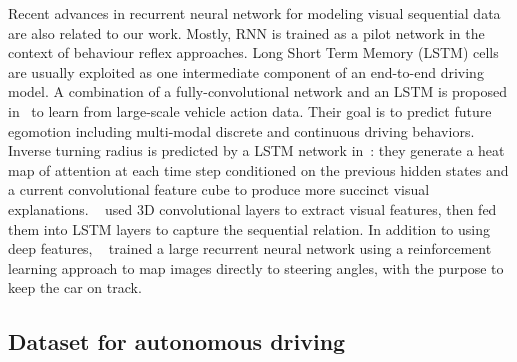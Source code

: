 \documentclass[10pt,twocolumn,letterpaper]{article}
\begin{document}
Recent advances in recurrent neural network for modeling visual sequential data are also related to our work.
Mostly, RNN is trained as a pilot network in the context of behaviour reflex approaches.
Long Short Term Memory (LSTM) cells are usually exploited as one intermediate component of an end-to-end driving model.
 A combination of a fully-convolutional network and an LSTM is proposed in~\cite{xu2017end} to learn from large-scale vehicle action data. Their goal is to predict future egomotion including multi-modal discrete and continuous driving behaviors. 
 Inverse turning radius is predicted by a LSTM network in~\cite{kim2017interpretable}: they generate a heat map of attention at each time step conditioned on the previous hidden states and a current convolutional feature cube  to produce more succinct visual explanations. ~\cite{duself} used 3D convolutional layers to extract visual features, then fed them into LSTM layers to capture the sequential relation. In addition to using deep features, ~\cite{koutnik2013evolving} trained a large recurrent neural network using a reinforcement learning approach to map images directly to steering angles, with the purpose to keep the car on track.
 
 

\subsection{Dataset for autonomous driving}
\end{document}
